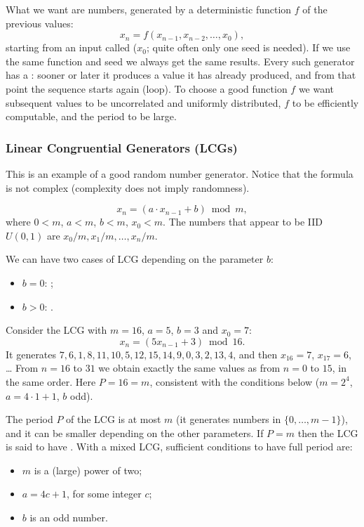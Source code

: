 What we want are  numbers, generated by a deterministic function $f$ of the previous values:
\[
x_n = f(x_{n-1}, x_{n-2}, \dots, x_0),
\]
starting from an input called  ($x_0$; quite often only one seed is needed). If we use the same function and seed we always get the same results. Every such generator has a : sooner or later it produces a value it has already produced, and from that point the sequence starts again (loop). To choose a good function $f$ we want subsequent values to be uncorrelated and uniformly distributed, $f$ to be efficiently computable, and the period to be large.

\subsubsection{Linear Congruential Generators (LCGs)}
This is an example of a good random number generator. Notice that the formula is not complex (complexity does not imply randomness).

\begin{definition}
\[
x_n = (a \cdot x_{n-1} + b) \bmod m,
\]
where $0 < m$, $a < m$, $b < m$, $x_0 < m$. The numbers that appear to be IID $U(0,1)$ are $x_0/m, x_1/m, \dots, x_n/m$.
\end{definition}

We can have two cases of LCG depending on the parameter $b$:
\begin{itemize}
\item $b = 0$: ;
\item $b > 0$: .
\end{itemize}

\begin{example}
Consider the LCG with $m = 16$, $a = 5$, $b = 3$ and $x_0 = 7$:
\[
x_n = (5 x_{n-1} + 3) \bmod 16.
\]
It generates $7, 6, 1, 8, 11, 10, 5, 12, 15, 14, 9, 0, 3, 2, 13, 4$, and then $x_{16} = 7$, $x_{17} = 6$, \dots{} From $n = 16$ to $31$ we obtain exactly the same values as from $n = 0$ to $15$, in the same order. Here $P = 16 = m$, consistent with the conditions below ($m = 2^4$, $a = 4 \cdot 1 + 1$, $b$ odd).
\end{example}

The period $P$ of the LCG is at most $m$ (it generates numbers in $\{0, \dots, m-1\}$), and it can be smaller depending on the other parameters. If $P = m$ then the LCG is said to have . With a mixed LCG, sufficient conditions to have full period are:
\begin{itemize}
\item $m$ is a (large) power of two;
\item $a = 4c + 1$, for some integer $c$;
\item $b$ is an odd number.
\end{itemize}

